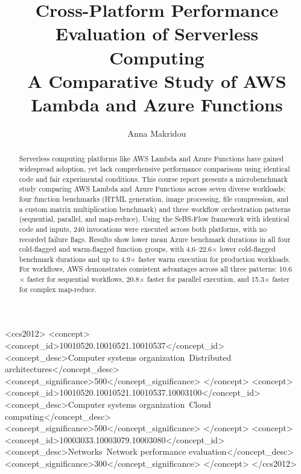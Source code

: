\documentclass[sigconf,nonacm]{acmart}
\begin{document}
\title{Cross-Platform Performance Evaluation of Serverless Computing\texorpdfstring{\\}{: }A Comparative Study of AWS Lambda and Azure Functions}

\author{Anna Makridou}

\begin{abstract}
Serverless computing platforms like AWS Lambda and Azure Functions have gained widespread adoption, yet lack comprehensive performance comparisons using identical code and fair experimental conditions. This course report presents a microbenchmark study comparing AWS Lambda and Azure Functions across seven diverse workloads: four function benchmarks (HTML generation, image processing, file compression, and a custom matrix multiplication benchmark) and three workflow orchestration patterns (sequential, parallel, and map-reduce). Using the SeBS-Flow framework with identical code and inputs, 240 invocations were executed across both platforms, with no recorded failure flags. Results show lower mean Azure benchmark durations in all four cold-flagged and warm-flagged function groups, with 4.6--22.6$\times$ lower cold-flagged benchmark durations and up to 4.9$\times$ faster warm execution for production workloads. For workflows, AWS demonstrates consistent advantages across all three patterns: 10.6$\times$ faster for sequential workflows, 20.8$\times$ faster for parallel execution, and 15.3$\times$ faster for complex map-reduce.
\end{abstract}

\begin{CCSXML}
<ccs2012>
   <concept>
       <concept_id>10010520.10010521.10010537</concept_id>
       <concept_desc>Computer systems organization~Distributed architectures</concept_desc>
       <concept_significance>500</concept_significance>
   </concept>
   <concept>
       <concept_id>10010520.10010521.10010537.10003100</concept_id>
       <concept_desc>Computer systems organization~Cloud computing</concept_desc>
       <concept_significance>500</concept_significance>
   </concept>
   <concept>
       <concept_id>10003033.10003079.10003080</concept_id>
       <concept_desc>Networks~Network performance evaluation</concept_desc>
       <concept_significance>300</concept_significance>
   </concept>
</ccs2012>
\end{CCSXML}
\end{document}
